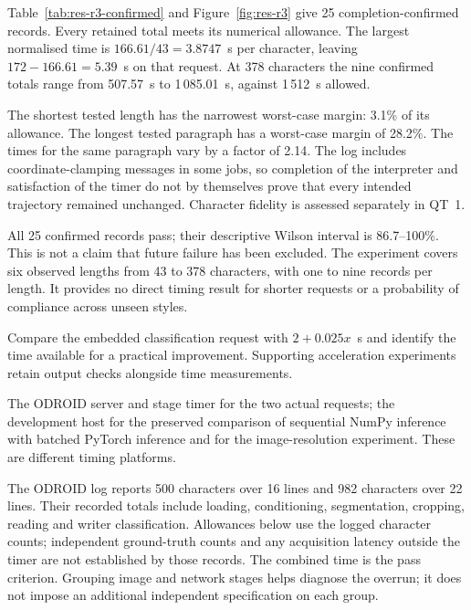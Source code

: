 Table~\ref{tab:res-r3-confirmed} and Figure~\ref{fig:res-r3} give 25 completion-confirmed records. Every retained total meets its numerical allowance. The largest normalised time is $166.61/43=3.8747$~s per character, leaving $172-166.61=5.39$~s on that request. At 378 characters the nine confirmed totals range from 507.57~s to 1\,085.01~s, against 1\,512~s allowed.


The shortest tested length has the narrowest worst-case margin: 3.1\% of its allowance. The longest tested paragraph has a worst-case margin of 28.2\%. The times for the same paragraph vary by a factor of 2.14. The log includes coordinate-clamping messages in some jobs, so completion of the interpreter and satisfaction of the timer do not by themselves prove that every intended trajectory remained unchanged. Character fidelity is assessed separately in QT~1.

All 25 confirmed records pass; their descriptive Wilson interval is 86.7--100\%. This is not a claim that future failure has been excluded. The experiment covers six observed lengths from 43 to 378 characters, with one to nine records per length. It provides no direct timing result for shorter requests or a probability of compliance across unseen styles.

Compare the embedded classification request with $2+0.025x$~s and identify the time available for a practical improvement. Supporting acceleration experiments retain output checks alongside time measurements.

The ODROID server and stage timer for the two actual requests; the development host for the preserved comparison of sequential NumPy inference with batched PyTorch inference and for the image-resolution experiment. These are different timing platforms.

The ODROID log reports 500 characters over 16 lines and 982 characters over 22 lines. Their recorded totals include loading, conditioning, segmentation, cropping, reading and writer classification. Allowances below use the logged character counts; independent ground-truth counts and any acquisition latency outside the timer are not established by those records. The combined time is the pass criterion. Grouping image and network stages helps diagnose the overrun; it does not impose an additional independent specification on each group.

